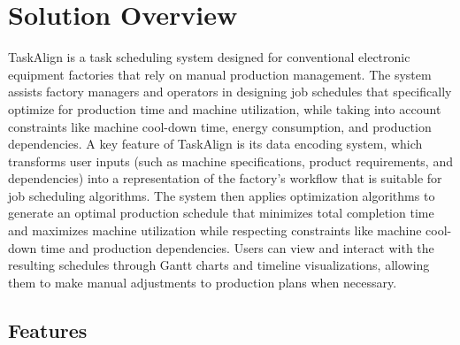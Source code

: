 \section{Solution Overview}
\label{section:solution-overview}

TaskAlign is a task scheduling system designed for conventional electronic equipment factories that rely on manual production management. The system assists factory managers and operators in designing job schedules that specifically optimize for production time and machine utilization, while taking into account constraints like machine cool-down time, energy consumption, and production dependencies. A key feature of TaskAlign is its data encoding system, which transforms user inputs (such as machine specifications, product requirements, and dependencies) into a representation of the factory's workflow that is suitable for job scheduling algorithms. The system then applies optimization algorithms to generate an optimal production schedule that minimizes total completion time and maximizes machine utilization while respecting constraints like machine cool-down time and production dependencies. Users can view and interact with the resulting schedules through Gantt charts and timeline visualizations, allowing them to make manual adjustments to production plans when necessary.

\subsection{Features}
\label{subsection:features}

